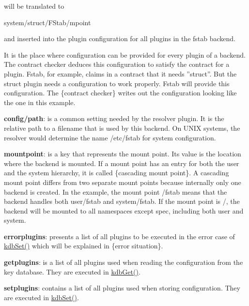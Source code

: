 will be translated to \begin{DoxyVerb}    system/struct/FStab/mpoint
\end{DoxyVerb}


and inserted into the plugin configuration for all plugins in the {\ttfamily fstab} backend.

It is the place where configuration can be provided for every plugin of a backend. The contract checker deduces this configuration to satisfy the contract for a plugin. Fstab, for example, claims in a contract that it needs ''struct''. But the struct plugin needs a configuration to work properly. Fstab will provide this configuration. The \{contract checker\} writes out the configuration looking like the one in this example.


\begin{DoxyItemize}
\item {\bfseries config/path}\+: is a common setting needed by the resolver plugin. It is the relative path to a filename that is used by this backend. On U\+N\+I\+X systems, the resolver would determine the name {\ttfamily /etc/fstab} for system configuration.
\item {\bfseries mountpoint}\+: is a key that represents the mount point. Its value is the location where the backend is mounted. If a mount point has an entry for both the user and the system hierarchy, it is called \{cascading mount point\}. A cascading mount point differs from two separate mount points because internally only one backend is created. In the example, the mount point {\ttfamily /fstab} means that the backend handles both {\ttfamily user/fstab} and {\ttfamily system/fstab}. If the mount point is {\ttfamily /}, the backend will be mounted to all namespaces except {\ttfamily spec}, including both {\ttfamily user} and {\ttfamily system}.
\item {\bfseries errorplugins}\+: presents a list of all plugins to be executed in the error case of {\ttfamily \hyperlink{group__kdb_ga11436b058408f83d303ca5e996832bcf}{kdb\+Set()}} which will be explained in \{error situation\}.
\item {\bfseries getplugins}\+: is a list of all plugins used when reading the configuration from the key database. They are executed in {\ttfamily \hyperlink{group__kdb_ga28e385fd9cb7ccfe0b2f1ed2f62453a1}{kdb\+Get()}}.
\item {\bfseries setplugins}\+: contains a list of all plugins used when storing configuration. They are executed in {\ttfamily \hyperlink{group__kdb_ga11436b058408f83d303ca5e996832bcf}{kdb\+Set()}}.
\end{DoxyItemize}

